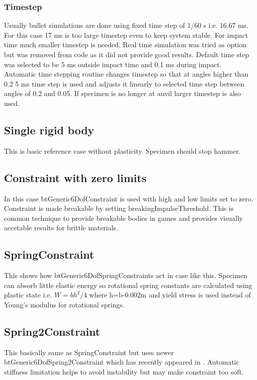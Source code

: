 \subsubsection{Timestep}

Usually bullet simulations are done using fixed time step of 1/60 s i.e. 16.67 ms. 
For this case 17 ms is too large timestep even to keep system stable. For impact time much smaller timestep is needed. 
Real time simulation was tried as option but was removed from code as it did not provide good results.  
Default time step was selected to be 5 ms outside impact time and 0.1 ms during impact. 
Automatic time stepping routine changes timestep so that at angles higher than 0.2 5 ms time step is
used and adjusts it linearly to selected time step between angles of 0.2 and 0.05. If specimen is no
longer at anvil larger timestep is also used.

\subsection{Single rigid body}
This is basic reference case without plasticity. Specimen should stop hammer.

\subsection{Constraint with zero limits}
In this case btGeneric6DofConstraint is used with high and low limits set to zero. 
Constraint is made breakable by setting breakingImpulseThreshold.
This is common technique to provide breakable bodies in games and provides visually accetable results for brittle materials.

\subsection{SpringConstraint}
This shows how btGeneric6DofSpringConstraints act in case like this. 
Specimen can absorb little elastic energy so rotational spring constants are calculated using plastic state i.e.
$W=bh^2/4$ where h=b-0.002m and yield stress is used instead of Young’s modulus for rotational springs.

\subsection{Spring2Constraint}
This basically same as SpringConstraint but uses newer btGeneric6DofSpring2Constraint which has recently appeared in
\bullet. 
Automatic stiffness limitation helps to avoid instability but may make constraint too soft.

